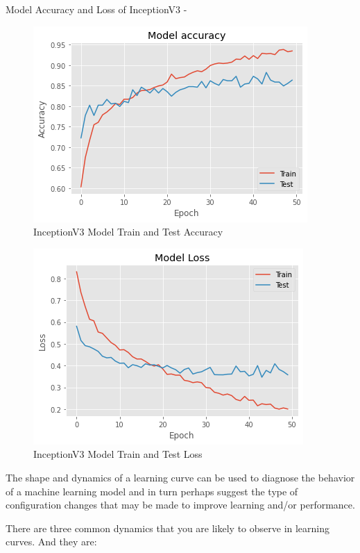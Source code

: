 \newpage
\vspace{5mm}
\noindent Model Accuracy and Loss of InceptionV3 -
\vspace{5mm}
\begin{figure}[hbt!]
\centering
\includegraphics[scale=1]{images/fig-33.png}
\caption{InceptionV3 Model Train and Test Accuracy}
\label{fig:x InceptionV3 Model Train and Test Accuracy}
\end{figure}

\vspace{5mm}
\begin{figure}[hbt!]
\centering
\includegraphics[scale=1]{images/fig-34.png}
\caption{InceptionV3 Model Train and Test Loss}
\label{fig:x InceptionV3 Model Train and Test Loss}
\end{figure}

\noindent The shape and dynamics of a learning curve can be used to diagnose the behavior of a machine learning model and in turn perhaps suggest the type of configuration changes that may be made to improve learning and/or performance.

\vspace{5mm}
\noindent There are three common dynamics that you are likely to observe in learning curves. And they are:

